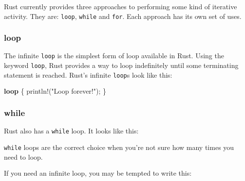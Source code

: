 \documentclass[a4paper,]{book}
\newenvironment{Shaded}{\begin{snugshade}}{\end{snugshade}}
\newcommand{\KeywordTok}[1]{\textcolor[rgb]{0.13,0.29,0.53}{\textbf{{#1}}}}
\newcommand{\DecValTok}[1]{\textcolor[rgb]{0.00,0.00,0.81}{{#1}}}
\newcommand{\StringTok}[1]{\textcolor[rgb]{0.31,0.60,0.02}{{#1}}}
\newcommand{\CommentTok}[1]{\textcolor[rgb]{0.56,0.35,0.01}{\textit{{#1}}}}
\newcommand{\OtherTok}[1]{\textcolor[rgb]{0.56,0.35,0.01}{{#1}}}
\newcommand{\NormalTok}[1]{{#1}}
\begin{document}
Rust currently provides three approaches to performing some kind of
iterative activity. They are: \texttt{loop}, \texttt{while} and
\texttt{for}. Each approach has its own set of uses.

\subsubsection{loop}\label{loop}

The infinite \texttt{loop} is the simplest form of loop available in
Rust. Using the keyword \texttt{loop}, Rust provides a way to loop
indefinitely until some terminating statement is reached. Rust's
infinite \texttt{loop}s look like this:

\begin{Shaded}
\begin{Highlighting}[]
\KeywordTok{loop} \NormalTok{\{}
    \OtherTok{println!}\NormalTok{(}\StringTok{"Loop forever!"}\NormalTok{);}
\NormalTok{\}}
\end{Highlighting}
\end{Shaded}

\subsubsection{while}\label{while}

Rust also has a \texttt{while} loop. It looks like this:

\begin{Shaded}
\end{Shaded}

\texttt{while} loops are the correct choice when you're not sure how
many times you need to loop.

If you need an infinite loop, you may be tempted to write this:
\end{document}
